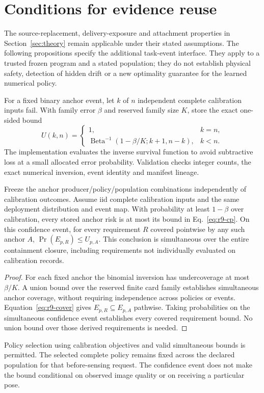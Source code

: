 \section{Conditions for evidence reuse}\label{sec:r9-theory}
The source-replacement, delivery-exposure and attachment properties in Section~\ref{sec:theory} remain applicable under their stated assumptions. The following propositions specify the additional task-event interface. They apply to a trusted frozen program and a stated population; they do not establish physical safety, detection of hidden drift or a new optimality guarantee for the learned numerical policy.

For a fixed binary anchor event, let $k$ of $n$ independent complete calibration inputs fail. With family error $\beta$ and reserved family size $K$, store the exact one-sided bound \cite{clopper1934}
\begin{equation}
U(k,n)=\begin{cases}1,&k=n,\\
\operatorname{Beta}^{-1}(1-\beta/K;k+1,n-k),&k<n.
\end{cases}\label{eq:r9-cp}
\end{equation}
The implementation evaluates the inverse survival function to avoid subtractive loss at a small allocated error probability. Validation checks integer counts, the exact numerical inversion, event identity and manifest lineage.

\begin{proposition}\label{prop:r9-closure}
Freeze the anchor producer/policy/population combinations independently of calibration outcomes. Assume iid complete calibration inputs and the same deployment distribution and event map. With probability at least $1-\beta$ over calibration, every stored anchor risk is at most its bound in Eq.~\eqref{eq:r9-cp}. On this confidence event, for every requirement $R$ covered pointwise by any such anchor $A$, $\Pr(E_{p,R})\le U_{p,A}$. This conclusion is simultaneous over the entire containment closure, including requirements not individually evaluated on calibration records.
\end{proposition}
\begin{proof}
For each fixed anchor the binomial inversion has undercoverage at most $\beta/K$. A union bound over the reserved finite card family establishes simultaneous anchor coverage, without requiring independence across policies or events. Equation~\eqref{eq:r9-cover} gives $E_{p,R}\subseteq E_{p,A}$ pathwise. Taking probabilities on the simultaneous confidence event establishes every covered requirement bound. No union bound over those derived requirements is needed.
\end{proof}
Policy selection using calibration objectives and valid simultaneous bounds is permitted. The selected complete policy remains fixed across the declared population for that before-sensing request. The confidence event does not make the bound conditional on observed image quality or on receiving a particular pose.

